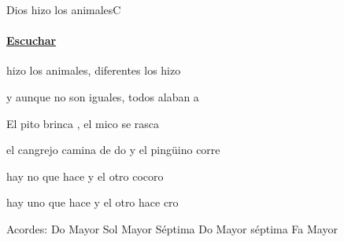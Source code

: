 \documentclass[12pt, spanish]{book}
\newcommand{\NotCCLIed}{\relax}
\begin{document}
    \begin{song}{Dios hizo los animales}{C}
    {\SBPubDom} %
    {}
    {} %
    {} %
        \ifChordBk
        \paragraph{\mbox{}\hfill\protect\href{https://open.spotify.com/intl-es/track/2WUS8sB0YXFtCFYAWoeT1T}{Escuchar}\mbox{}\hfill}
        \fi

        \begin{SBOpGroup}
             hizo los animales, diferentes los hizo 

            y aunque no son iguales, todos alaban a 
        \end{SBOpGroup}

        \begin{SBChorus}
            El pito brinca , el mico se rasca 

            el cangrejo camina de do y el pingüino corre 

            hay no que hace  y el otro cocoro

            hay uno que hace  y el otro hace cro 
        \end{SBChorus}

        \ifChordBk
        \begin{SBOpGroup}
            Acordes:
            \upchord{\C}\qquad Do Mayor  \hfill
            \upchord{\Gseven}\qquad Sol Mayor S\'eptima \hfill\null\break
            \upchord{\Cseven}\qquad Do Mayor s\'eptima \hfill
            \upchord{\F}\qquad Fa Mayor \hfill\null\break
        \end{SBOpGroup}
        \fi
    \end{song}
\end{document}
